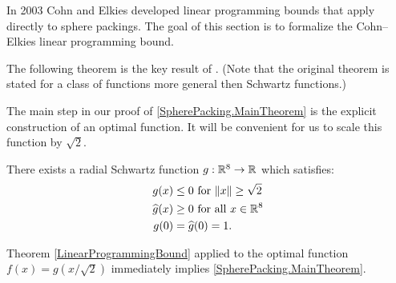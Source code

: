 In 2003 Cohn and Elkies \cite{ElkiesCohn}  developed  linear programming bounds that apply directly to sphere packings. The goal of this section is to formalize the Cohn--Elkies linear programming bound.

The following theorem is the key result of \cite{ElkiesCohn}. (Note that the original theorem is stated for a class of functions more general then Schwartz functions.)




The main step in our proof of \cref{SpherePacking.MainTheorem} is the explicit construction of an optimal function. It will be convenient for us to scale this function by $\sqrt{2}$.
\begin{theorem}\label{thm:g}
There exists a radial Schwartz function $g:\mathbb{R}^8\to\mathbb{R}$ which satisfies:
\begin{align}
g(x)&\leq 0\mbox{ for } \|x\|\geq \sqrt{2} \label{eqn:g1}\\
\widehat{g}(x)&\geq0\mbox{ for all } x\in\mathbb{R}^8\label{eqn:g2}\\
g(0)&=\widehat{g}(0)=1.\label{eqn:g3}
\end{align}
\end{theorem}
Theorem \ref{LinearProgrammingBound} applied to the optimal function $f(x)=g(x/\sqrt{2})$ immediately implies \cref{SpherePacking.MainTheorem}.
